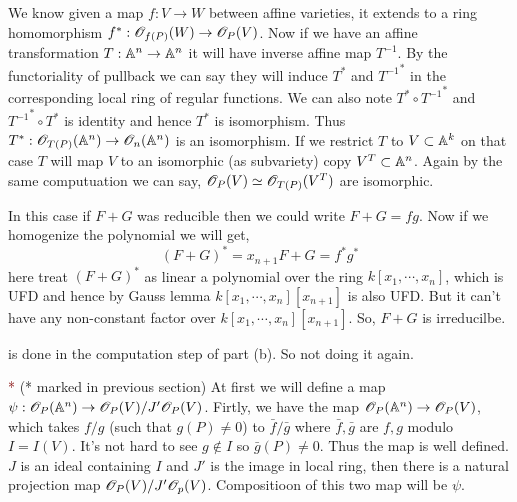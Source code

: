 \documentclass[12pt]{article}
\begin{document}
\textcolor{maroon}{} We know given a map $f : V \to W$ between affine varieties, it extends to a ring homomorphism $f^{\ast}: \mathscr{O}_{f(P)}(W) \to \mathscr{O}_{P}(V)$. Now if we have an affine transformation $T : \mathbb{A}^n \to \mathbb{A}^n$ it will have inverse affine map $T^{-1}$. By the functoriality of pullback we can say they will induce $T^{\ast}$ and ${T^{-1}}^{\ast}$ in the corresponding local ring of regular functions. We can also note $T^{\ast} \circ {T^{-1}}^{\ast}$ and ${T^{-1}}^{\ast} \circ T^{\ast}$ is identity and hence $T^{\ast}$ is isomorphism. Thus $T^{\ast}: \mathscr{O}_{T(P)}(\mathbb{A}^n) \to \mathscr{O}_n(\mathbb{A}^n)$ is an isomorphism. If we restrict $T$ to $V \subset \mathbb{A}^k$ on that case $T$ will map $V$ to an isomorphic (as subvariety) copy $V^T\subset \mathbb{A}^n$. Again by the same computuation we can say, $\mathscr{O}_{P}(V) \simeq \mathscr{O}_{T(P)}(V^T)$ are isomorphic.

\vspace*{0.2cm}

\noindent  \textcolor{maroon}{} In this case if $F+G$ was reducible then we could write $F+G = fg$. Now if we homogenize the polynomial we will get, $$(F+G)^{\ast} = x_{n+1}F+G = f^{\ast} g^{\ast}$$ here treat $(F+G)^{\ast}$ as linear a polynomial over the ring $k[x_1,\cdots,x_n]$, which is UFD and hence by Gauss lemma $k[x_1,\cdots,x_n][x_{n+1}]$ is also UFD. But it can't have any non-constant factor over $k[x_1,\cdots,x_n][x_{n+1}]$. So, $F+G$ is irreducilbe. 

\vspace*{0.2cm}

\noindent \textcolor{maroon}{} is done in the computation step of  part (b). So not doing it again.

\vspace*{0.2cm}

\noindent \textcolor{maroon}{*} (* marked in previous section) At first we will define a map $\psi : \mathscr{O}_P(\mathbb{A}^n) \to \mathscr{O}_P(V)/J'\mathscr{O}_P(V)$. Firtly, we have the map $\mathscr{O}_P(\mathbb{A}^n) \to \mathscr{O}_P(V)$, which takes $f/g$ (such that $g(P)\neq 0$) to $\bar{f}/\bar{g}$ where $\bar{f},\bar{g}$ are $f,g$ modulo $I = I(V)$. It's not hard to see $g \notin I$ so $\bar{g}(P)\neq0$. Thus the map is well defined. $J$ is an ideal containing $I$ and $J'$ is the image in local ring, then there is a natural projection map $\mathscr{O}_P(V)/J'\mathscr{O}_p(V)$. Compositioon of this two map will be $\psi$.

\vspace*{0.2cm}
\end{document}

